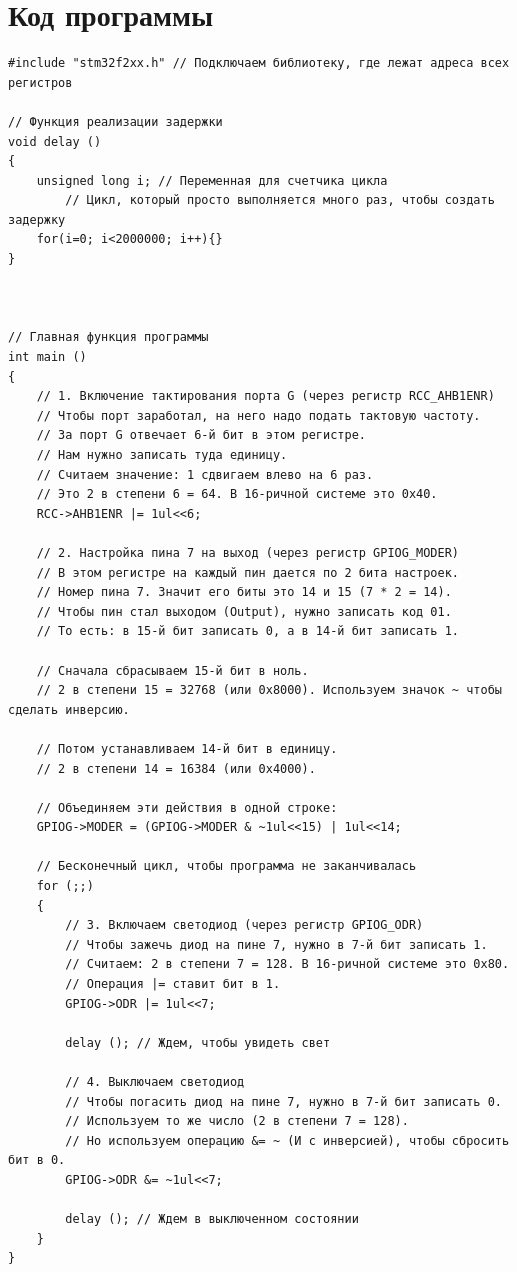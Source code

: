 \newpage

\section*{Код программы}

\begin{lstlisting}[style=cstyle, caption={Основная функция программы}]
#include "stm32f2xx.h" // Подключаем библиотеку, где лежат адреса всех регистров

// Функция реализации задержки
void delay ()
{
    unsigned long i; // Переменная для счетчика цикла
		// Цикл, который просто выполняется много раз, чтобы создать задержку
    for(i=0; i<2000000; i++){} 
}



// Главная функция программы
int main ()
{
    // 1. Включение тактирования порта G (через регистр RCC_AHB1ENR)
    // Чтобы порт заработал, на него надо подать тактовую частоту.
    // За порт G отвечает 6-й бит в этом регистре.
    // Нам нужно записать туда единицу.
    // Считаем значение: 1 сдвигаем влево на 6 раз.
    // Это 2 в степени 6 = 64. В 16-ричной системе это 0x40.
    RCC->AHB1ENR |= 1ul<<6; 

    // 2. Настройка пина 7 на выход (через регистр GPIOG_MODER)
    // В этом регистре на каждый пин дается по 2 бита настроек.
    // Номер пина 7. Значит его биты это 14 и 15 (7 * 2 = 14).
    // Чтобы пин стал выходом (Output), нужно записать код 01.
    // То есть: в 15-й бит записать 0, а в 14-й бит записать 1.
    
    // Сначала сбрасываем 15-й бит в ноль.
    // 2 в степени 15 = 32768 (или 0x8000). Используем значок ~ чтобы сделать инверсию.
    
    // Потом устанавливаем 14-й бит в единицу.
    // 2 в степени 14 = 16384 (или 0x4000).
    
    // Объединяем эти действия в одной строке:
    GPIOG->MODER = (GPIOG->MODER & ~1ul<<15) | 1ul<<14;

    // Бесконечный цикл, чтобы программа не заканчивалась
    for (;;)
    {
        // 3. Включаем светодиод (через регистр GPIOG_ODR)
        // Чтобы зажечь диод на пине 7, нужно в 7-й бит записать 1.
        // Считаем: 2 в степени 7 = 128. В 16-ричной системе это 0x80.
        // Операция |= ставит бит в 1.
        GPIOG->ODR |= 1ul<<7;

        delay (); // Ждем, чтобы увидеть свет

        // 4. Выключаем светодиод
        // Чтобы погасить диод на пине 7, нужно в 7-й бит записать 0.
        // Используем то же число (2 в степени 7 = 128).
        // Но используем операцию &= ~ (И с инверсией), чтобы сбросить бит в 0.
        GPIOG->ODR &= ~1ul<<7;

        delay (); // Ждем в выключенном состоянии
    }
}
\end{lstlisting}

